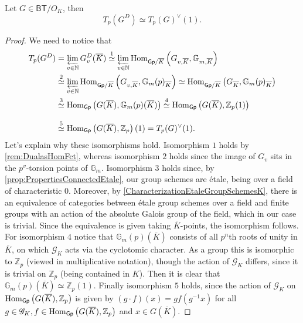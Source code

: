 \begin{prop}[]\label{TateModuleDuals}
	Let $G \in \mathsf{BT}/O_K$, then
	\begin{equation*}
		T_p(G^D) \simeq T_p(G)^\vee(1)
	.\end{equation*}
\end{prop}
\begin{proof}
	We need to notice that
	\begin{align*}
		T_p(G^D) &= \varprojlim_{v \in \mathbb{N}} G_v^D(\overline{K})
		\stackrel{1}{\simeq} \varprojlim_{v \in \mathbb{N}}
		\Hom_{ \mathsf{Gp}/\overline{K} }
		\left( G_{  v,\overline{K}}, \mathbb{G}_{ m,\overline{K}} \right) \\
		&\stackrel{2}{\simeq} \varprojlim_{v \in \mathbb{N}}
		\Hom_{ \mathsf{Gp}/\overline{K} }
		\left( G_{ v,\overline{K}}, {\mathbb{G}_m(p)}_{\overline{K}}\right)
		\simeq \Hom_{ \mathsf{Gp}/\overline{K} }
		\left( {G}_{\overline{K}}, {\mathbb{G}_m(p)}_{\overline{K}} \right)\\
		&\stackrel{3}{\simeq} \Hom_{ \mathsf{Gp} } 
		\left( G(\overline{K}), \mathbb{G}_m(p)(\overline{K}) \right)
		\stackrel{4}{\simeq} \Hom_{ \mathsf{Gp} } 
		\left( G(\overline{K}), \mathbb{Z}_{p}(1) \right) 
		\phantom{\varprojlim_{v \in \mathbb{N}}}\\
		&\stackrel{5}{\simeq} \Hom_{ \mathsf{Gp} } 
		\left( G(\overline{K}), \mathbb{Z}_{p} \right)(1)
		= T_p(G)^\vee(1)
	.\end{align*}
	Let's explain why these isomorphisms hold.
	Isomorphism $1$ holds by \cref{rem:DualasHomFct}, whereas isomorphism $2$
	holds since the image of $G_v$ sits in the $p^v$-torsion points of $\mathbb{G}_m$.
	Isomorphism $3$ holds since, by \cref{prop:PropertiesConnectedEtale}, our group
	schemes are étale, being over a field of characteristic $0$.
	Moreover, by \cref{CharacterizationEtaleGroupSchemesK}, there is an equivalence of categories
	between étale group schemes over a field and finite groups with an action
	of the absolute Galois group of the field, which in our case is trivial.
	Since the equivalence is given taking $\overline{K}$-points, the isomorphism follows.
	For isomorphism $4$ notice that $\mathbb{G}_m(p)(\overline{K})$ consists of all
	$p^n$th roots of unity in $\overline{K}$, on which $\mathscr{G}_K$ acts via the cyclotomic character.
	As a group this is isomorphic to $\mathbb{Z}_{p}$ (viewed in multiplicative notation),
	though the action of $\mathscr{G}_K$ differs, since
	it is trivial on $\mathbb{Z}_{p}$ (being contained in $K$).
	Then it is clear that $\mathbb{G}_m(p)(\overline{K}) \simeq \mathbb{Z}_{p}(1)$.
	Finally isomorphism $5$ holds, since the action of $\mathscr{G}_K$ on 
	$\operatorname{Hom}_{ \mathsf{Gp} } \left( G(\overline{K}), \mathbb{Z}_{p} \right)$
	is given by $(g \cdot f)(x) = gf(g^{-1}x)$ for all $g \in \mathscr{G}_K, 
	f \in \operatorname{Hom}_{\mathsf{Gp}} \left( G(\overline{K}), \mathbb{Z}_{p} \right)$
	and $x \in G(\overline{K})$.
\end{proof}
